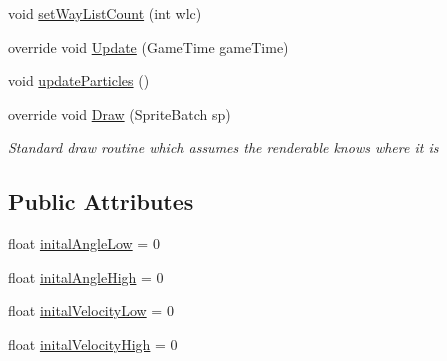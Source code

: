 \begin{DoxyCompactItemize}
void \mbox{\hyperlink{class_r_c___framework_1_1_particle_system_af6c1685abb024ef387dc160fb1db4bad}{set\+Way\+List\+Count}} (int wlc)
\item 
override void \mbox{\hyperlink{class_r_c___framework_1_1_particle_system_a658681cf664bb153b4defb6a861bc721}{Update}} (Game\+Time game\+Time)
\item 
void \mbox{\hyperlink{class_r_c___framework_1_1_particle_system_a8097f166bded1c9a4e511e4d22e09541}{update\+Particles}} ()
\item 
override void \mbox{\hyperlink{class_r_c___framework_1_1_particle_system_a2cb9a22f944e93697fff3128a1d3ddb6}{Draw}} (Sprite\+Batch sp)
\begin{DoxyCompactList}\small\item\em Standard draw routine which assumes the renderable knows where it is \end{DoxyCompactList}\end{DoxyCompactItemize}
\subsection*{Public Attributes}
\begin{DoxyCompactItemize}
\item 
float \mbox{\hyperlink{class_r_c___framework_1_1_particle_system_a6f21e255387e86b9352f7ba362f4737c}{inital\+Angle\+Low}} = 0
\item 
float \mbox{\hyperlink{class_r_c___framework_1_1_particle_system_a5b6110ac4cdeffb18a96fdc5a3782956}{inital\+Angle\+High}} = 0
\item 
float \mbox{\hyperlink{class_r_c___framework_1_1_particle_system_a5703bd6030e08d2047d574d269f936e0}{inital\+Velocity\+Low}} = 0
\item 
float \mbox{\hyperlink{class_r_c___framework_1_1_particle_system_acf82c04377b18711b36f2d31ae460ad9}{inital\+Velocity\+High}} = 0
\end{DoxyCompactItemize}
